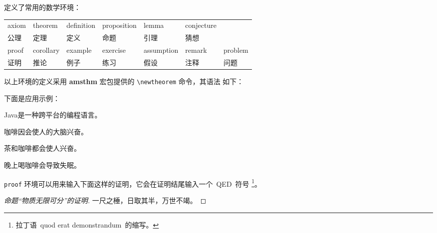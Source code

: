 \zzuthesis{} 定义了常用的数学环境：
\begin{center}
\begin{tabular}{*{7}{l}}\hline
  axiom & theorem & definition & proposition & lemma & conjecture &\\
  公理 & 定理 & 定义 & 命题 & 引理 & 猜想 &\\\hline
  proof & corollary & example & exercise & assumption & remark & problem \\
  证明 & 推论 & 例子& 练习 & 假设 & 注释 & 问题\\\hline
\end{tabular}
\end{center}

以上环境的定义采用 \textbf{amsthm} 宏包提供的 \verb|\newtheorem| 命令，其语法
如下：

\begin{code}
\newtheorem{环境名}[编号延续]{显示名}[编号层次]
\end{code}

% 
下面是应用示例：
\begin{definition}
Java是一种跨平台的编程语言。
\end{definition}

\begin{theorem}
咖啡因会使人的大脑兴奋。
\end{theorem}

\begin{lemma}
茶和咖啡都会使人兴奋。
\end{lemma}

\begin{corollary}
晚上喝咖啡会导致失眠。
\end{corollary}

\texttt{proof} 环境可以用来输入下面这样的证明，它会在证明结尾输入一个~QED~符号
\footnote{拉丁语~quod erat demonstrandum~的缩写。}。

\begin{proof}[命题“物质无限可分”的证明]
一尺之棰，日取其半，万世不竭。
\end{proof}

